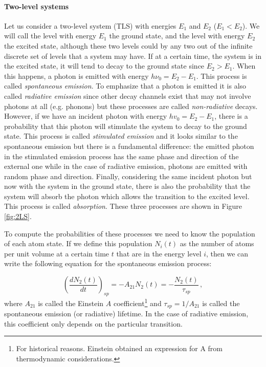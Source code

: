 \documentclass[11pt,a4paper]{article}
\begin{document}
\paragraph{Two-level systems}
Let us consider a two-level system (TLS) with energies $E_1$ and $E_2$ ($E_1<E_2$). We will call the level with energy $E_1$ the ground state, and the level with energy $E_2$ the excited state, although these two levels could by any two out of the infinite discrete set of levels that a system may have. If at a certain time, the system is in the excited state, it will tend to decay to the ground state since $E_2>E_1$. When this happens, a photon is emitted with energy $h\nu_0=E_2-E_1$. This process is called \emph{spontaneous emission}. To emphasize that a photon is emitted it is also called \emph{radiative emission} since other decay channels exist that may not involve photons at all (e.g. phonons) but these processes are called \emph{non-radiative} decays. However, if we have an incident photon with energy $hv_0=E_2-E_1$, there is a probability that this photon will stimulate the system to decay to the ground state. This process is called \emph{stimulated emission} and it looks similar to the spontaneous emission but there is a fundamental difference: the emitted photon in the stimulated emission process has the same phase and direction of the external one while in the case of radiative emission, photons are emitted with random phase and direction. Finally, considering the same incident photon but now with the system in the ground state, there is also the probability that the system will absorb the photon which allows the transition to the excited level. This process is called \emph{absorption}. These three processes are shown in Figure \ref{fig:2LS}.

To compute the probabilities of these processes we need to know the population of each atom state. If we define this population $N_i(t)$ as the number of atoms per unit volume at a certain time $t$ that are in the energy level $i$, then we can write the following equation for the spontaneous emission process:

\begin{equation}\label{eq:spontaneous_emission}
\left(\frac{dN_2(t)}{dt}\right)_{sp}=-A_{21}N_2(t)=-\frac{N_2(t)}{\tau_{sp}}\,,
\end{equation}
where $A_{21}$ is called the Einstein $A$ coefficient\footnote{For historical reasons. Einstein obtained an expression for A from thermodynamic considerations.} and $\tau_{sp}=1/A_{21}$ is called the spontaneous emission (or radiative) lifetime. In the case of radiative emission, this coefficient only depends on the particular transition.
\end{document}
